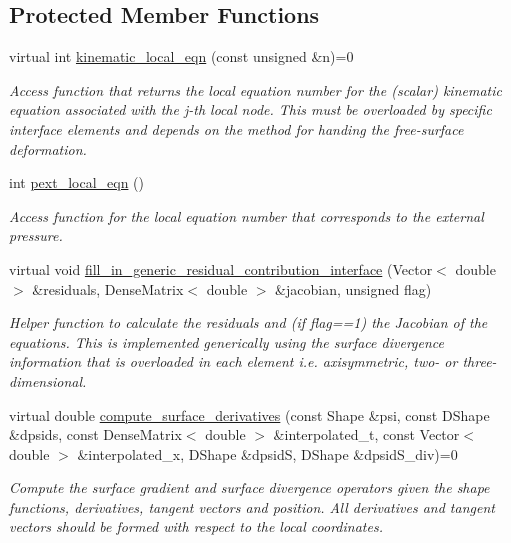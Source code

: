 \subsection*{Protected Member Functions}
\begin{DoxyCompactItemize}
\item 
virtual int \hyperlink{classoomph_1_1FluidInterfaceElement_a58a82e2fd839d4381e43d46a22bf1f25}{kinematic\+\_\+local\+\_\+eqn} (const unsigned \&n)=0
\begin{DoxyCompactList}\small\item\em Access function that returns the local equation number for the (scalar) kinematic equation associated with the j-\/th local node. This must be overloaded by specific interface elements and depends on the method for handing the free-\/surface deformation. \end{DoxyCompactList}\item 
int \hyperlink{classoomph_1_1FluidInterfaceElement_abd4aece98dee8173c6d796e23ccf1e03}{pext\+\_\+local\+\_\+eqn} ()
\begin{DoxyCompactList}\small\item\em Access function for the local equation number that corresponds to the external pressure. \end{DoxyCompactList}\item 
virtual void \hyperlink{classoomph_1_1FluidInterfaceElement_ae4ea3a18a513bed3725fdf413cf18874}{fill\+\_\+in\+\_\+generic\+\_\+residual\+\_\+contribution\+\_\+interface} (Vector$<$ double $>$ \&residuals, Dense\+Matrix$<$ double $>$ \&jacobian, unsigned flag)
\begin{DoxyCompactList}\small\item\em Helper function to calculate the residuals and (if flag==1) the Jacobian of the equations. This is implemented generically using the surface divergence information that is overloaded in each element i.\+e. axisymmetric, two-\/ or three-\/dimensional. \end{DoxyCompactList}\item 
virtual double \hyperlink{classoomph_1_1FluidInterfaceElement_a0180a8e36fadbbe6984f9b3c5edffc81}{compute\+\_\+surface\+\_\+derivatives} (const Shape \&psi, const D\+Shape \&dpsids, const Dense\+Matrix$<$ double $>$ \&interpolated\+\_\+t, const Vector$<$ double $>$ \&interpolated\+\_\+x, D\+Shape \&dpsidS, D\+Shape \&dpsid\+S\+\_\+div)=0
\begin{DoxyCompactList}\small\item\em Compute the surface gradient and surface divergence operators given the shape functions, derivatives, tangent vectors and position. All derivatives and tangent vectors should be formed with respect to the local coordinates. \end{DoxyCompactList}\item 

\end{DoxyCompactItemize}

